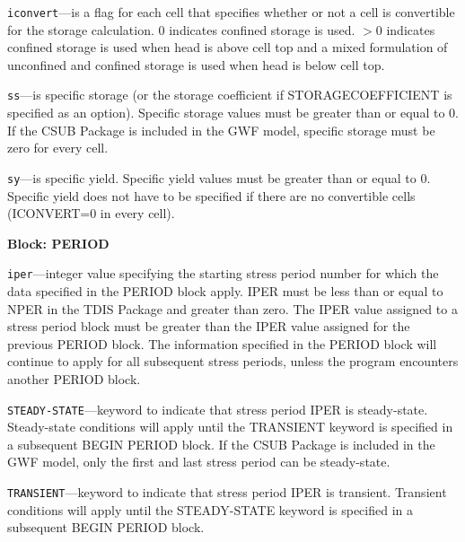 \begin{description}
\item \texttt{iconvert}---is a flag for each cell that specifies whether or not a cell is convertible for the storage calculation. 0 indicates confined storage is used. $>$0 indicates confined storage is used when head is above cell top and a mixed formulation of unconfined and confined storage is used when head is below cell top.

\item \texttt{ss}---is specific storage (or the storage coefficient if STORAGECOEFFICIENT is specified as an option). Specific storage values must be greater than or equal to 0. If the CSUB Package is included in the GWF model, specific storage must be zero for every cell.

\item \texttt{sy}---is specific yield. Specific yield values must be greater than or equal to 0. Specific yield does not have to be specified if there are no convertible cells (ICONVERT=0 in every cell).

\end{description}
\item \textbf{Block: PERIOD}

\begin{description}
\item \texttt{iper}---integer value specifying the starting stress period number for which the data specified in the PERIOD block apply.  IPER must be less than or equal to NPER in the TDIS Package and greater than zero.  The IPER value assigned to a stress period block must be greater than the IPER value assigned for the previous PERIOD block.  The information specified in the PERIOD block will continue to apply for all subsequent stress periods, unless the program encounters another PERIOD block.

\item \texttt{STEADY-STATE}---keyword to indicate that stress period IPER is steady-state. Steady-state conditions will apply until the TRANSIENT keyword is specified in a subsequent BEGIN PERIOD block. If the CSUB Package is included in the GWF model, only the first and last stress period can be steady-state.

\item \texttt{TRANSIENT}---keyword to indicate that stress period IPER is transient. Transient conditions will apply until the STEADY-STATE keyword is specified in a subsequent BEGIN PERIOD block.

\end{description}

